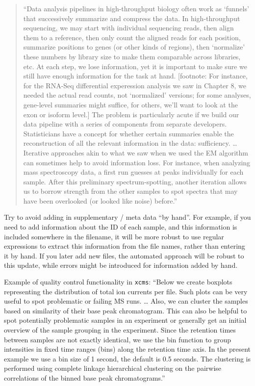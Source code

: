 \documentclass[]{tufte-book}
\begin{document}
\begin{quote}
``Data analysis pipelines in high-throughput biology often work as `funnels'
that successively summarize and compress the data. In high-throughput
sequencing, we may start with individual sequencing reads, then align them to
a reference, then only count the aligned reads for each position, summarize
positions to genes (or other kinds of regions), then `normalize' these numbers
by library size to make them comparable across libraries, etc. At each step,
we lose information, yet it is important to make sure we still have enough
information for the task at hand. {[}footnote: For instance, for the RNA-Seq
differential experession analysis we saw in Chapter 8, we needed the actual
read counts, not `normalized' versions; for some analyses, gene-level summaries
might suffice, for others, we'll want to look at the exon or isoform level.{]}
The problem is particularly acute if we build our data pipeline with a series
of components from separate developers. Statisticians have a concept for
whether certain summaries enable the reconstruction of all the relevant
information in the data: sufficiency. \ldots{} Iterative approaches akin to what
we saw when we used the EM algorithm can sometimes help to avoid information
loss. For instance, when analyzing mass spectroscopy data, a first run
guesses at peaks individually for each sample. After this preliminary
spectrum-spotting, another iteration allows us to borrow strength from the
other samples to spot spectra that may have been overlooked (or looked like
noise) before.'' \citep{holmes2018modern}
\end{quote}

Try to avoid adding in supplementary / meta data ``by hand''. For example, if you
need to add information about the ID of each sample, and this information is
included somewhere in the filename, it will be more robust to use regular
expressions to extract this information from the file names, rather than
entering it by hand. If you later add new files, the automated approach will
be robust to this update, while errors might be introduced for information
added by hand.

Example of quality control functionality in \texttt{xcms}:
``Below we create boxplots representing the distribution of total ion currents per file. Such plots can be very useful to spot problematic or failing MS runs.
\ldots{} Also, we can cluster the samples based on similarity of their base peak chromatogram. This can also be helpful to spot potentially problematic samples in an experiment or generally get an initial overview of the sample grouping in the experiment. Since the retention times between samples are not exactly identical, we use the bin function to group intensities in fixed time ranges (bins) along the retention time axis. In the present example we use a bin size of 1 second, the default is 0.5 seconds. The clustering is performed using complete linkage hierarchical clustering on the pairwise correlations of the binned base peak chromatograms.''
\citep{smith2013lc}
\end{document}
